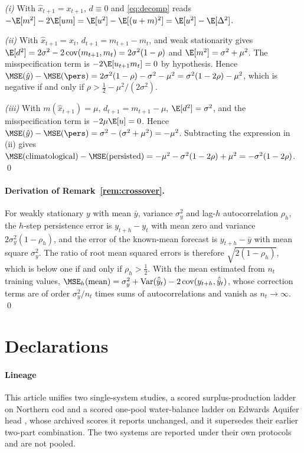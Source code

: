 \emph{(i)} With $\hat x_{t+1}=x_{t+1}$, $d\equiv 0$ and \eqref{eq:decomp} reads $-\E[m^2]-2\E[um] = \E[u^2]-\E[(u+m)^2] = \E[u^2]-\E[\Delta^2]$.

\emph{(ii)} With $\hat x_{t+1}=x_t$, $d_{t+1}=m_{t+1}-m_t$, and weak stationarity gives $\E[d^2] = 2\sigma^2 - 2\operatorname{cov}(m_{t+1},m_t) = 2\sigma^2(1-\rho)$ and $\E[m^2]=\sigma^2+\mu^2$. The misspecification term is $-2\E[u_{t+1}m_t]=0$ by hypothesis. Hence $\MSE(\hat y)-\MSE(\pers) = 2\sigma^2(1-\rho)-\sigma^2-\mu^2 = \sigma^2(1-2\rho)-\mu^2$, which is negative if and only if $\rho > \tfrac12 - \mu^2/(2\sigma^2)$.

\emph{(iii)} With $m(\hat x_{t+1})=\mu$, $d_{t+1}=m_{t+1}-\mu$, $\E[d^2]=\sigma^2$, and the misspecification term is $-2\mu\E[u]=0$. Hence $\MSE(\hat y)-\MSE(\pers) = \sigma^2-(\sigma^2+\mu^2) = -\mu^2$. Subtracting the expression in (ii) gives $\MSE(\text{climatological})-\MSE(\text{persisted}) = -\mu^2 - \sigma^2(1-2\rho)+\mu^2 = -\sigma^2(1-2\rho)$. \qed

\paragraph{Derivation of Remark~\ref{rem:crossover}.} For weakly stationary $y$ with mean $\bar y$, variance $\sigma_y^2$ and lag-$h$ autocorrelation $\rho_h$, the $h$-step persistence error is $y_{t+h}-y_t$ with mean zero and variance $2\sigma_y^2(1-\rho_h)$, and the error of the known-mean forecast is $y_{t+h}-\bar y$ with mean square $\sigma_y^2$. The ratio of root mean squared errors is therefore $\sqrt{2(1-\rho_h)}$, which is below one if and only if $\rho_h>\tfrac12$. With the mean estimated from $n_t$ training values, $\MSE_h(\mathrm{mean}) = \sigma_y^2 + \operatorname{Var}(\hat{\bar y}_t) - 2\operatorname{cov}(y_{t+h},\hat{\bar y}_t)$, whose correction terms are of order $\sigma_y^2/n_t$ times sums of autocorrelations and vanish as $n_t\to\infty$. \qed

\section*{Declarations}

\paragraph{Lineage} This article unifies two single-system studies, a scored surplus-production ladder on Northern cod \citep{Abaee2026cod} and a scored one-pool water-balance ladder on Edwards Aquifer head \citep{Abaee2026edwards}, whose archived scores it reports unchanged, and it supersedes their earlier two-part combination. The two systems are reported under their own protocols and are not pooled.

